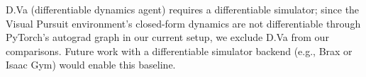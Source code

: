 
D.Va (differentiable dynamics agent) requires a differentiable simulator; since the Visual Pursuit environment's closed-form dynamics are not differentiable through PyTorch's autograd graph in our current setup, we exclude D.Va from our comparisons. Future work with a differentiable simulator backend (e.g., Brax or Isaac Gym) would enable this baseline.
